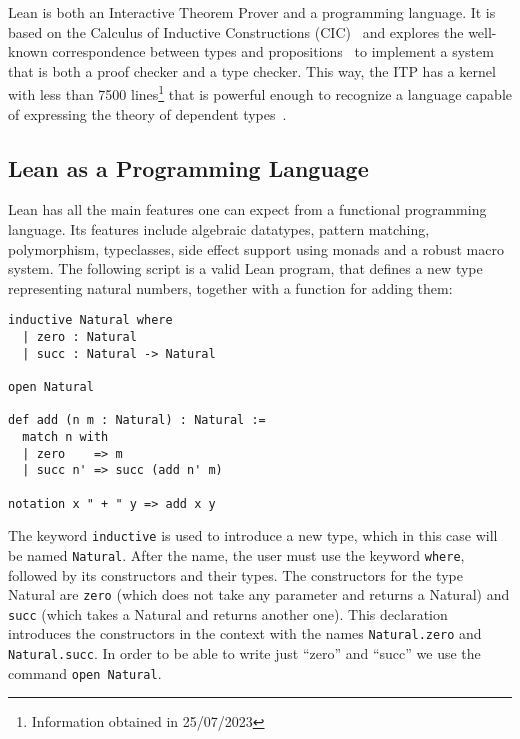 
Lean is both an Interactive Theorem Prover and a programming
language. It is based on the Calculus of Inductive Constructions (CIC)~\cite{cic_ref} and explores the well-known correspondence between types and propositions~\cite{ch_correspondence} to implement a system that is both a proof checker and a type checker. This way, the ITP has a kernel with less than 7500 lines\footnote{Information obtained in 25/07/2023} that is powerful enough to recognize a language capable of expressing the theory of dependent types~\cite{dep_type_theory}.

\subsection{Lean as a Programming Language}

Lean has all the main features one can expect from a functional programming language. Its features include algebraic datatypes, pattern matching, polymorphism, typeclasses, side effect support using monads and a robust macro system. The following script is a valid Lean program, that defines a new type representing natural numbers, together with a function for adding them:

\begin{verbatim}
inductive Natural where
  | zero : Natural
  | succ : Natural -> Natural

open Natural

def add (n m : Natural) : Natural :=
  match n with
  | zero    => m
  | succ n' => succ (add n' m)

notation x " + " y => add x y
\end{verbatim}

The keyword \texttt{inductive} is used to introduce a new type, which in this case will be named \texttt{Natural}. After the name, the user must use the keyword \texttt{where}, followed by its constructors and their types. The constructors for the type Natural are \texttt{zero} (which does not take any parameter and returns a Natural) and \texttt{succ} (which takes a Natural and returns another one). This declaration introduces the constructors in the context with the names \texttt{Natural.zero} and \texttt{Natural.succ}. In order to be able to write just ``zero'' and ``succ'' we use the command \texttt{open Natural}.

